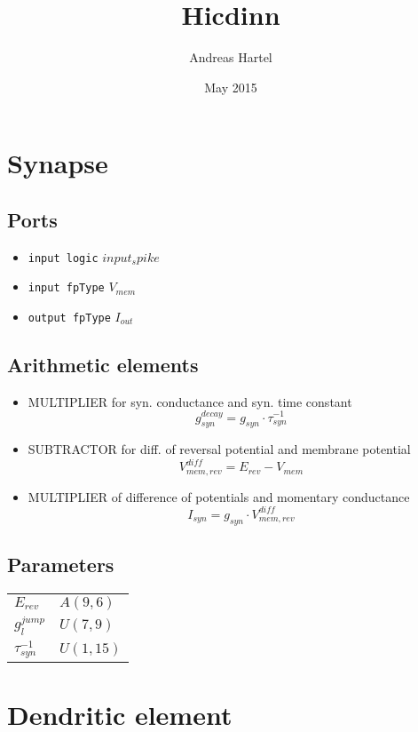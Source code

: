 \documentclass[a4paper]{report}
\begin{document}
\title{Hicdinn}
\author{Andreas Hartel}
\date{May 2015}
\maketitle

\section{Synapse}
\subsection{Ports}
	\begin{itemize}
		\item \texttt{input logic} $input_spike$
		\item \texttt{input fpType} $V_{mem}$
		\item \texttt{output fpType} $I_{out}$
	\end{itemize}
\subsection{Arithmetic elements}
\begin{itemize}
	\item MULTIPLIER for syn. conductance and syn. time constant
		\begin{equation}
			g_{syn}^{decay} = g_{syn} \cdot \tau_{syn}^{-1}
		\end{equation}
	\item SUBTRACTOR for diff. of reversal potential and membrane potential
		\begin{equation}
			V_{mem,rev}^{diff} = E_{rev} - V_{mem}
		\end{equation}
	\item MULTIPLIER of difference of potentials and momentary conductance
		\begin{equation}
			I_{syn} = g_{syn} \cdot V_{mem,rev}^{diff}
		\end{equation}
\end{itemize}
\subsection{Parameters}
\begin{tabular}{ll}
$E_{rev}$ & $A(9,6)$\\
$g_l^{jump}$ & $U(7,9)$\\
$\tau_{syn}^{-1}$ & $U(1,15)$\\
\end{tabular}
\section{Dendritic element}
\end{document}
